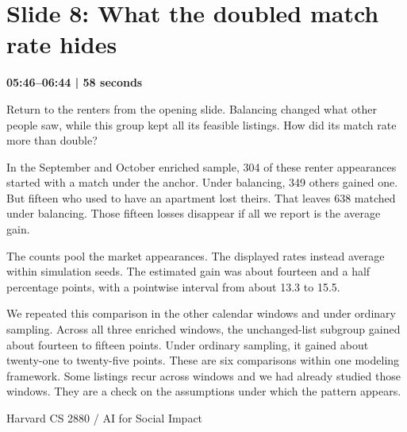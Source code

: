 \documentclass[11pt]{article}
\begin{document}
\section*{Slide 8: What the doubled match rate hides}
{\color{navy}\textbf{05:46--06:44 | 58 seconds}}\par\medskip
Return to the renters from the opening slide. Balancing changed what other people saw, while this group kept all its feasible listings. How did its match rate more than double?
\par
In the September and October enriched sample, 304 of these renter appearances started with a match under the anchor. Under balancing, 349 others gained one. But fifteen who used to have an apartment lost theirs. That leaves 638 matched under balancing. Those fifteen losses disappear if all we report is the average gain.
\par
The counts pool the market appearances. The displayed rates instead average within simulation seeds. The estimated gain was about fourteen and a half percentage points, with a pointwise interval from about 13.3 to 15.5.
\par
We repeated this comparison in the other calendar windows and under ordinary sampling. Across all three enriched windows, the unchanged-list subgroup gained about fourteen to fifteen points. Under ordinary sampling, it gained about twenty-one to twenty-five points. These are six comparisons within one modeling framework. Some listings recur across windows and we had already studied those windows. They are a check on the assumptions under which the pattern appears.
\par
\newpage
{\small Harvard CS 2880 / AI for Social Impact}\par
\end{document}
